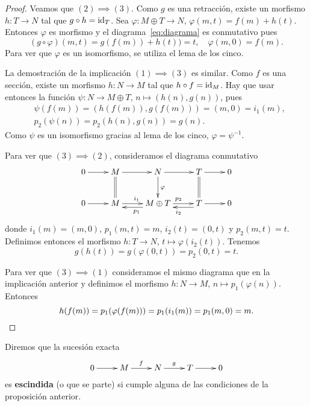 \begin{proof}
Veamos que $(2)\implies(3)$. Como $g$ es una retracción, existe un morfismo $h\colon T\to N$ tal que
$g\circ h=\operatorname{id}_T$. Sea $\varphi\colon M\oplus T\to N$, $\varphi(m,t)=f(m)+h(t)$. 
Entonces $\varphi$ es morfismo y 
el diagrama~\eqref{eq:diagrama} es conmutativo pues
\[
(g\circ\varphi)(m,t)=g(f(m))+h(t))=t,\quad
\varphi(m,0)=f(m).
\]
Para ver que $\varphi$ es un isomorfismo, se utiliza el lema de los cinco. 

La demostración de la implicación $(1)\implies(3)$ es similar. Como
$f$ es una sección, existe un morfismo $h\colon N\to M$ tal que $h\circ f=\operatorname{id}_M$. 
Hay que usar entonces la función $\psi\colon N\to M\oplus T$, $n\mapsto (h(n),g(n))$, pues
\begin{align*}
	&\psi(f(m))=(h(f(m)),g(f(m)))=(m,0)=i_1(m),\\
	&p_2(\psi(n))=p_2(h(n),g(n))=g(n).
\end{align*}
Como $\psi$ es un isomorfismo gracias al lema de los cinco, $\varphi=\psi^{-1}$. 

Para ver que $(3)\implies (2)$, consideramos el diagrama conmutativo
\[
        \xymatrix{
        0\ar[r] 
        & M
        \ar@{=}[d]
        \ar[r]
        & N
        \ar[r]
        \ar@{->}[d]^\varphi
        & T\ar[r]
        \ar@{=}[d]
        & 0
        \\
        0\ar[r] 
        & M
        \ar[r]^{i_1}
        & M\oplus T        
        \ar[r]^{p_2}
        \ar@<1ex>[l]^{p_1}
        & T\ar[r]
        \ar@<1ex>[l]^{i_2}
        & 0
        }
\]
      donde $i_1(m)=(m,0)$, $p_1(m,t)=m$, $i_2(t)=(0,t)$ y $p_2(m,t)=t$. 
      Definimos entonces el morfismo $h\colon T\to N$, $t\mapsto \varphi(i_2(t))$. Tenemos
      \[
      g(h(t))=g(\varphi(0,t))=p_2(0,t)=t.
      \] 
      
      Para ver que $(3)\implies (1)$ 
      consideramos el mismo diagrama que en la implicación anterior 
      y definimos el morfismo $h\colon N\to M$, $n\mapsto p_1(\varphi(n))$. Entonces
      \[
      h(f(m))=p_1(\varphi(f(m)))=p_1(i_1(m))=p_1(m,0)=m.\qedhere
      \]
 \end{proof}

Diremos que la sucesión exacta
	\[  
		\xymatrix{
        0\ar[r]
        & M
        \ar[r]^f
        & N
        \ar[r]^g
        & T\ar[r]
        & 0	
        }
     \]
es \textbf{escindida} (o que se parte) si cumple 
alguna de las condiciones de la proposición anterior.    


